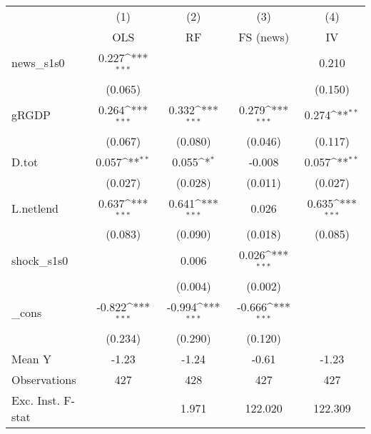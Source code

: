 {
\def\sym#1{\ifmmode^{#1}\else\(^{#1}\)\fi}
\begin{tabular}{l*{4}{c}}
\toprule
            &\multicolumn{1}{c}{(1)}&\multicolumn{1}{c}{(2)}&\multicolumn{1}{c}{(3)}&\multicolumn{1}{c}{(4)}\\
            &\multicolumn{1}{c}{OLS}&\multicolumn{1}{c}{RF}&\multicolumn{1}{c}{FS (news)}&\multicolumn{1}{c}{IV}\\
\midrule
news\_s1s0   &       0.227\sym{***}&                     &                     &       0.210         \\
            &     (0.065)         &                     &                     &     (0.150)         \\
\addlinespace
gRGDP       &       0.264\sym{***}&       0.332\sym{***}&       0.279\sym{***}&       0.274\sym{**} \\
            &     (0.067)         &     (0.080)         &     (0.046)         &     (0.117)         \\
\addlinespace
D.tot       &       0.057\sym{**} &       0.055\sym{*}  &      -0.008         &       0.057\sym{**} \\
            &     (0.027)         &     (0.028)         &     (0.011)         &     (0.027)         \\
\addlinespace
L.netlend   &       0.637\sym{***}&       0.641\sym{***}&       0.026         &       0.635\sym{***}\\
            &     (0.083)         &     (0.090)         &     (0.018)         &     (0.085)         \\
\addlinespace
shock\_s1s0  &                     &       0.006         &       0.026\sym{***}&                     \\
            &                     &     (0.004)         &     (0.002)         &                     \\
\addlinespace
\_cons      &      -0.822\sym{***}&      -0.994\sym{***}&      -0.666\sym{***}&                     \\
            &     (0.234)         &     (0.290)         &     (0.120)         &                     \\
\midrule
Mean Y      &       -1.23         &       -1.24         &       -0.61         &       -1.23         \\
Observations&         427         &         428         &         427         &         427         \\
Exc. Inst. F-stat&                     &       1.971         &     122.020         &     122.309         \\
\bottomrule
\end{tabular}
}
